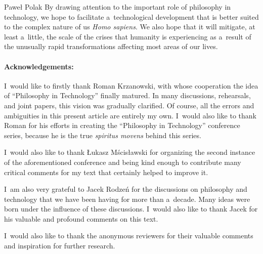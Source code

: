 \begin{artengenv}{Paweł Polak}
By drawing attention to the important role of philosophy in technology, we hope to facilitate a~technological development that is better suited to the complex nature of us \textit{Homo sapiens}. We also hope that it will mitigate, at least a~little, the scale of the crises that humanity is experiencing as a~result of the unusually rapid transformations affecting most areas of our lives.



\paragraph{Acknowledgements:}
I~would like to firstly thank Roman Krza\-nowski, with whose cooperation the idea of ``Philosophy in Technology'' finally matured. In many discussions, rehearsals, and joint papers, this vision was gradually clarified. Of course, all the errors and ambiguities in this present article are entirely my own. I~would also like to thank Roman for his efforts in creating the ``Philosophy in Technology'' conference series, because he is the true \textit{spiritus movens} behind this series.



I~would also like to thank Łukasz Mścisławski for organizing the second instance of the aforementioned conference and being kind enough to contribute many critical comments for my text that certainly helped to improve it.



I~am also very grateful to Jacek Rodzeń for the discussions on philosophy and technology that we have been having for more than a~decade. Many ideas were born under the influence of these discussions. I~would also like to thank Jacek for his valuable and profound comments on this text.



I~would also like to thank the anonymous reviewers for their valuable comments and inspiration for further research.
\enlargethispage{1.5\baselineskip}


\end{artengenv}


